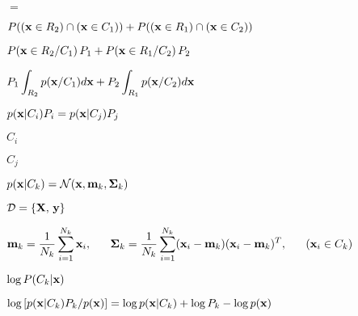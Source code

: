 \documentclass{article}
\def\lthtmlcheckvsize{\ifdim\ht\sizebox<\vsize 
  \ifdim\wd\sizebox<\hsize\expandafter\hfill\fi \expandafter\vfill
  \else\expandafter\vss\fi}%
\begin{document}
{\newpage\clearpage
{}%
$\displaystyle =$%
\lthtmlindisplaymathZ
\lthtmlcheckvsize\clearpage}

{\newpage\clearpage
{}%
$\displaystyle P(({\bf x}\in R_2) \cap ({\bf x}\in C_1))
+P(({\bf x}\in R_1) \cap ({\bf x}\in C_2))$%
\lthtmlindisplaymathZ
\lthtmlcheckvsize\clearpage}

{\newpage\clearpage
{}%
$\displaystyle P({\bf x} \in R_2/C_1)\,P_1
+P({\bf x} \in R_1/C_2)\,P_2$%
\lthtmlindisplaymathZ
\lthtmlcheckvsize\clearpage}

{\newpage\clearpage
{}%
$\displaystyle P_1 \int_{R_2}p({\bf x}/C_1)d{\bf x}
+P_2\int_{R_1}p({\bf x}/C_2)d{\bf x}$%
\lthtmlindisplaymathZ
\lthtmlcheckvsize\clearpage}

{\newpage\clearpage
{}%
$ p({\bf x}|C_i)P_i=p({\bf x}|C_j)P_j$%
\lthtmlindisplaymathZ
\lthtmlcheckvsize\clearpage}

{\newpage\clearpage
{}%
$ C_i$%
\lthtmlindisplaymathZ
\lthtmlcheckvsize\clearpage}

{\newpage\clearpage
{}%
$ C_j$%
\lthtmlindisplaymathZ
\lthtmlcheckvsize\clearpage}

{\newpage\clearpage
{}%
$ p({\bf x}|C_k)={\cal N}({\bf x},{\bf m}_k,{\bf\Sigma}_k)$%
\lthtmlindisplaymathZ
\lthtmlcheckvsize\clearpage}

{\newpage\clearpage
{}%
$ {\cal D}=\{{\bf X},\,{\bf y}\}$%
\lthtmlindisplaymathZ
\lthtmlcheckvsize\clearpage}

{\newpage\clearpage
{}%
$\displaystyle {\bf m}_k=\frac{1}{N_k}\sum_{i=1}^{N_k} {\bf x}_i,
\;\;\;\;\;\;
{\bf\Sigma}_k=\frac{1}{N_k}\sum_{i=1}^{N_k}
({\bf x}_i-{\bf m}_k)({\bf x}_i-{\bf m}_k)^T,
\;\;\;\;\;\;({\bf x}_i\in C_k)$%
\lthtmlindisplaymathZ
\lthtmlcheckvsize\clearpage}

{\newpage\clearpage
{}%
$\displaystyle \log P(C_k|{\bf x})$%
\lthtmlindisplaymathZ
\lthtmlcheckvsize\clearpage}

{\newpage\clearpage
{}%
$\displaystyle \log \left[ p({\bf x}|C_k) P_k/p({\bf x}) \right]
=\log p({\bf x}|C_k) +\log P_k-\log p({\bf x})$%
\lthtmlindisplaymathZ
\lthtmlcheckvsize\clearpage}
\end{document}
